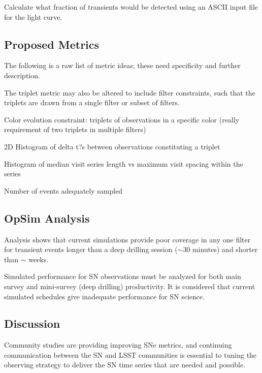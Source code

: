 Calculate what fraction of transients would be detected using an ASCII
input file for the light curve.

\subsection{Proposed Metrics}

The following is a raw list of metric ideas; these need specificity
and further description.

The triplet metric may also be altered to include filter constraints,
such that the triplets are drawn from a single filter or subset of
filters.

Color evolution constraint: triplets of observations in a specific
color (really requirement of two triplets in multiple filters)

  2D Histogram of delta t?s between observations constituting a triplet

Histogram of median visit series length vs maximum visit spacing
within the series

Number of events adequately sampled


\subsection{OpSim Analysis}
\label{sec:\chpname:analysis}

Analysis shows that current simulations provide  poor coverage in any one filter for transient events longer than a deep drilling session ($\sim$30 minutes) and shorter than $\sim$ weeks.

Simulated performance for SN observations must be analyzed for both
main survey and mini-survey (deep drilling) productivity.  It is
considered that current simulated schedules give inadequate
performance for SN science.




\subsection{Discussion}
\label{sec:\chpname:discussion}

Community studies are providing improving SNe metrics, and continuing
communication between the SN and LSST communities is essential to
tuning the observing strategy to deliver the SN time series that are
needed and possible.

